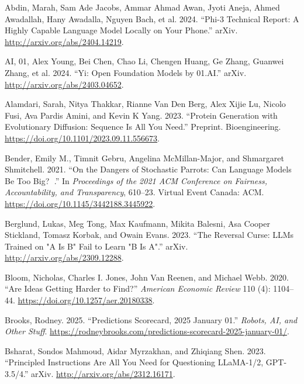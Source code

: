 \documentclass[
  Letterpaper,
]{scrbook}
\newlength{\cslhangindent}
\newenvironment{CSLReferences}[2] %
 {\begin{list}{}{%
  \setlength{\itemindent}{0pt}
  \setlength{\leftmargin}{0pt}
  \setlength{\parsep}{0pt}
  \ifodd #1
   \setlength{\leftmargin}{\cslhangindent}
   \setlength{\itemindent}{-1\cslhangindent}
  \fi
  \setlength{\itemsep}{#2\baselineskip}}}
 {\end{list}}
\begin{document}
\label{refs}
\begin{CSLReferences}{1}{0}
Abdin, Marah, Sam Ade Jacobs, Ammar Ahmad Awan, Jyoti Aneja, Ahmed
Awadallah, Hany Awadalla, Nguyen Bach, et al. 2024. {``Phi-3 {Technical}
{Report}: {A} {Highly} {Capable} {Language} {Model} {Locally} on {Your}
{Phone}.''} arXiv. \url{http://arxiv.org/abs/2404.14219}.

AI, 01, Alex Young, Bei Chen, Chao Li, Chengen Huang, Ge Zhang, Guanwei
Zhang, et al. 2024. {``Yi: {Open} {Foundation} {Models} by 01.{AI}.''}
arXiv. \url{http://arxiv.org/abs/2403.04652}.

Alamdari, Sarah, Nitya Thakkar, Rianne Van Den Berg, Alex Xijie Lu,
Nicolo Fusi, Ava Pardis Amini, and Kevin K Yang. 2023. {``Protein
Generation with Evolutionary Diffusion: Sequence Is All You Need.''}
Preprint. Bioengineering.
\url{https://doi.org/10.1101/2023.09.11.556673}.

Bender, Emily M., Timnit Gebru, Angelina McMillan-Major, and Shmargaret
Shmitchell. 2021. {``On the {Dangers} of {Stochastic} {Parrots}: {Can}
{Language} {Models} {Be} {Too} {Big}? 🦜.''} In \emph{Proceedings of the
2021 {ACM} {Conference} on {Fairness}, {Accountability}, and
{Transparency}}, 610--23. Virtual Event Canada: ACM.
\url{https://doi.org/10.1145/3442188.3445922}.

Berglund, Lukas, Meg Tong, Max Kaufmann, Mikita Balesni, Asa Cooper
Stickland, Tomasz Korbak, and Owain Evans. 2023. {``The {Reversal}
{Curse}: {LLMs} Trained on "{A} Is {B}" Fail to Learn "{B} Is {A}".''}
arXiv. \url{http://arxiv.org/abs/2309.12288}.

Bloom, Nicholas, Charles I. Jones, John Van Reenen, and Michael Webb.
2020. {``Are {Ideas} {Getting} {Harder} to {Find}?''} \emph{American
Economic Review} 110 (4): 1104--44.
\url{https://doi.org/10.1257/aer.20180338}.

Brooks, Rodney. 2025. {``Predictions {Scorecard}, 2025 {January} 01.''}
\emph{Robots, AI, and Other Stuff}.
\url{https://rodneybrooks.com/predictions-scorecard-2025-january-01/}.

Bsharat, Sondos Mahmoud, Aidar Myrzakhan, and Zhiqiang Shen. 2023.
{``Principled {Instructions} {Are} {All} {You} {Need} for {Questioning}
{LLaMA}-1/2, {GPT}-3.5/4.''} arXiv.
\url{http://arxiv.org/abs/2312.16171}.


\end{CSLReferences}
\end{document}
